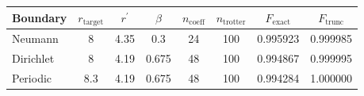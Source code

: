 \begin{tabular}{lccccccc}
\toprule
Boundary & $r_{\mathrm{target}}$ & $r^\prime$ & $\beta$ & $n_{\mathrm{coeff}}$ & $n_{\mathrm{trotter}}$ & $F_{\mathrm{exact}}$ & $F_{\mathrm{trunc}}$ \\
\midrule
Neumann & 8 & 4.35 & 0.3 & 24 & 100 & 0.995923 & 0.999985 \\
Dirichlet & 8 & 4.19 & 0.675 & 48 & 100 & 0.994867 & 0.999995 \\
Periodic & 8.3 & 4.19 & 0.675 & 48 & 100 & 0.994284 & 1.000000 \\
\bottomrule
\end{tabular}
